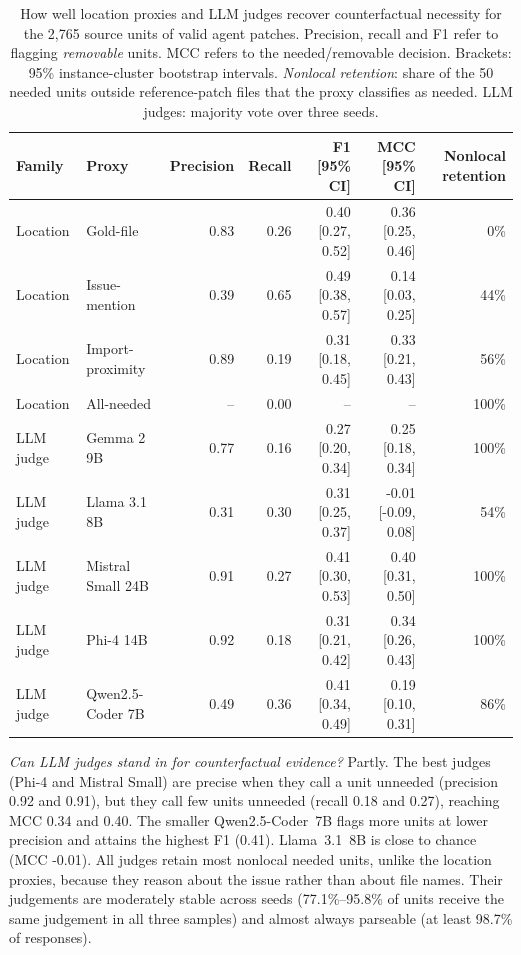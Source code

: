 \documentclass[a4paper,fleqn]{cas-sc}
\newcommand{\rqtwoFoneLqwencoderb}{0.41}
\newcommand{\rqtwoMccLllamab}{-0.01}
\newcommand{\rqtwoMccLmistralsmallb}{0.40}
\newcommand{\rqtwoMccLphib}{0.34}
\newcommand{\rqtwoParseMin}{98.7\%}
\newcommand{\rqtwoPrecLmistralsmallb}{0.91}
\newcommand{\rqtwoPrecLphib}{0.92}
\newcommand{\rqtwoRecLmistralsmallb}{0.27}
\newcommand{\rqtwoRecLphib}{0.18}
\newcommand{\rqtwoSeedAgreeMax}{95.8\%}
\newcommand{\rqtwoSeedAgreeMin}{77.1\%}
\begin{document}
\begin{table}[t]
\caption{How well location proxies and LLM judges recover counterfactual necessity for the 2{,}765 source units of valid agent patches. Precision, recall and F1 refer to flagging \emph{removable} units. MCC refers to the needed/removable decision. Brackets: 95\% instance-cluster bootstrap intervals. \emph{Nonlocal retention}: share of the 50 needed units outside reference-patch files that the proxy classifies as needed. LLM judges: majority vote over three seeds.}
\label{tab:proxies}
\centering\footnotesize
\begin{tabular}{llrrrrr}
\toprule
Family & Proxy & Precision & Recall & F1 [95\% CI] & MCC [95\% CI] & Nonlocal retention \\
\midrule
Location & Gold-file & 0.83 & 0.26 & 0.40 [0.27, 0.52] & 0.36 [0.25, 0.46] & 0\% \\
Location & Issue-mention & 0.39 & 0.65 & 0.49 [0.38, 0.57] & 0.14 [0.03, 0.25] & 44\% \\
Location & Import-proximity & 0.89 & 0.19 & 0.31 [0.18, 0.45] & 0.33 [0.21, 0.43] & 56\% \\
Location & All-needed & -- & 0.00 & -- & -- & 100\% \\
\midrule
LLM judge & Gemma 2 9B & 0.77 & 0.16 & 0.27 [0.20, 0.34] & 0.25 [0.18, 0.34] & 100\% \\
LLM judge & Llama 3.1 8B & 0.31 & 0.30 & 0.31 [0.25, 0.37] & -0.01 [-0.09, 0.08] & 54\% \\
LLM judge & Mistral Small 24B & 0.91 & 0.27 & 0.41 [0.30, 0.53] & 0.40 [0.31, 0.50] & 100\% \\
LLM judge & Phi-4 14B & 0.92 & 0.18 & 0.31 [0.21, 0.42] & 0.34 [0.26, 0.43] & 100\% \\
LLM judge & Qwen2.5-Coder 7B & 0.49 & 0.36 & 0.41 [0.34, 0.49] & 0.19 [0.10, 0.31] & 86\% \\
\bottomrule
\end{tabular}
\end{table}

\emph{Can LLM judges stand in for counterfactual evidence?} Partly. The best judges (Phi-4 and Mistral Small) are precise when they call a unit unneeded (precision \rqtwoPrecLphib{} and \rqtwoPrecLmistralsmallb{}), but they call few units unneeded (recall \rqtwoRecLphib{} and \rqtwoRecLmistralsmallb{}), reaching MCC \rqtwoMccLphib{} and \rqtwoMccLmistralsmallb{}. The smaller Qwen2.5-Coder~7B flags more units at lower precision and attains the highest F1 (\rqtwoFoneLqwencoderb{}). Llama~3.1~8B is close to chance (MCC \rqtwoMccLllamab{}). All judges retain most nonlocal needed units, unlike the location proxies, because they reason about the issue rather than about file names. Their judgements are moderately stable across seeds (\rqtwoSeedAgreeMin--\rqtwoSeedAgreeMax{} of units receive the same judgement in all three samples) and almost always parseable (at least \rqtwoParseMin{} of responses).
\end{document}
